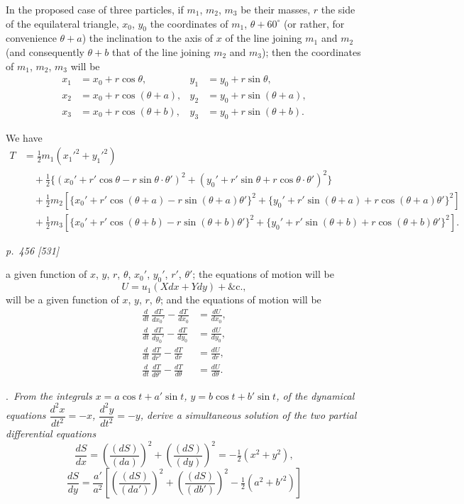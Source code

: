 \documentclass[11pt,a4paper]{book}
\begin{document}
In the proposed case of three particles, if $m_1$, $m_2$, $m_3$ be their masses, $r$ the
side of the equilateral triangle, $x_0$, $y_0$ the coordinates of $m_1$, $\theta + 60^\circ$ (or rather, for convenience $\theta + a$) the inclination to the axis of $x$ of the line joining $m_1$ and $m_2$ (and consequently $\theta + b$ that of the line joining $m_2$ and $m_3$); then the coordinates of $m_1$, $m_2$, $m_3$ will be
\begin{align*}
x_1 &= x_0 + r\cos\theta, & y_1 &= y_0 + r\sin\theta, \\
x_2 &= x_0 + r\cos(\theta + a), & y_2 &= y_0 + r\sin(\theta + a), \\
x_3 &= x_0 + r\cos(\theta + b), & y_3 &= y_0 + r\sin(\theta + b).
\end{align*}

We have
\begin{align*}
T &= \tfrac{1}{2}m_1(x_1'^2 + y_1'^2) \\
  &\quad + \tfrac{1}{2}\{(x_0' + r'\cos\theta - r\sin\theta\cdot\theta')^2 + (y_0' + r'\sin\theta + r\cos\theta\cdot\theta')^2\} \\
  &\quad + \tfrac{1}{2}m_2[\{x_0' + r'\cos(\theta + a) - r\sin(\theta + a)\theta'\}^2 + \{y_0' + r'\sin(\theta + a) + r\cos(\theta + a)\theta'\}^2] \\
  &\quad + \tfrac{1}{2}m_3[\{x_0' + r'\cos(\theta + b) - r\sin(\theta + b)\theta'\}^2 + \{y_0' + r'\sin(\theta + b) + r\cos(\theta + b)\theta'\}^2].
\end{align*}

\clearpage

\bigskip
\textit{p.~456 [531]}
\smallskip

\noindent
a given function of $x$, $y$, $r$, $\theta$, $x_0'$, $y_0'$, $r'$, $\theta'$; the equations of motion will be
\[
U = u_1(Xdx + Ydy) + \text{\&c.},
\]
will be a given function of $x$, $y$, $r$, $\theta$; and the equations of motion will be
\begin{align*}
\frac{d}{dt}\,\frac{dT}{dx_0'} - \frac{dT}{dx_0} &= \frac{dU}{dx_0}, \\
\frac{d}{dt}\,\frac{dT}{dy_0'} - \frac{dT}{dy_0} &= \frac{dU}{dy_0}, \\
\frac{d}{dt}\,\frac{dT}{dr'} - \frac{dT}{dr} &= \frac{dU}{dr}, \\
\frac{d}{dt}\,\frac{dT}{d\theta'} - \frac{dT}{d\theta} &= \frac{dU}{d\theta}.
\end{align*}

\medskip
{}.\ \textit{From the integrals $x = a\cos t + a'\sin t$, $y = b\cos t + b'\sin t$, of the dynamical
equations $\dfrac{d^2x}{dt^2} = -x$, $\dfrac{d^2y}{dt^2} = -y$, derive a simultaneous solution of the two partial differential
equations
\[
\frac{dS}{dx} = \left(\frac{(dS)}{(da)}\right)^2 + \left(\frac{(dS)}{(dy)}\right)^2 = -\tfrac{1}{2}(x^2 + y^2),
\]
\[
\frac{dS}{dy} = \frac{a'}{a^2}\left[\left(\frac{(dS)}{(da')}\right)^2 + \left(\frac{(dS)}{(db')}\right)^2 - \tfrac{1}{2}(a^2 + b'^2)\right]
\]}
\end{document}
